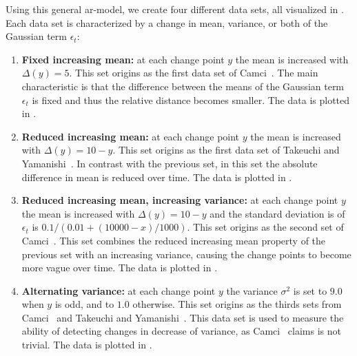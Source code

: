Using this general \gls{ar}-model, we create four different data sets, all visualized in .
Each data set is characterized by a change in mean, variance, or both of the Gaussian term $\epsilon_t$:
\begin{enumerate}
  \item \textbf{Fixed increasing mean:} at each change point $y$ the mean is increased with $\Delta(y) = 5$.
  This set origins as the first data set of Camci~\cite{camci2010change}.
  The main characteristic is that the difference between the means of the Gaussian term $\epsilon_t$ is fixed and thus the relative distance becomes smaller.
  The data is plotted in .

  \item \textbf{Reduced increasing mean:} at each change point $y$ the mean is increased with $\Delta(y) = 10 - y$.
  This set origins as the first data set of Takeuchi and Yamanishi~\cite{takeuchi2006unifying}.
  In contrast with the previous set, in this set the absolute difference in mean is reduced over time.
  The data is plotted in .

  \item \textbf{Reduced increasing mean, increasing variance:} at each change point $y$ the mean is increased with $\Delta(y) = 10 - y$ and the standard deviation is of $\epsilon_t$ is $0.1 / (0.01 + (10000 - x)/1000)$.
  This set origins as the second set of Camci~\cite{camci2010change}.
  This set combines the reduced increasing mean property of the previous set with an increasing variance, causing the change points to become more vague over time.
  The data is plotted in .

  \item \textbf{Alternating variance:} at each change point $y$ the variance $\sigma^2$ is set to $9.0$ when $y$ is odd, and to $1.0$ otherwise.
  This set origins as the thirds sets from Camci~\cite{camci2010change} and Takeuchi and Yamanishi~\cite{takeuchi2006unifying}.
  This data set is used to measure the ability of detecting changes in decrease of variance, as Camci~\cite{camci2010change} claims is not trivial.
  The data is plotted in .
\end{enumerate}

